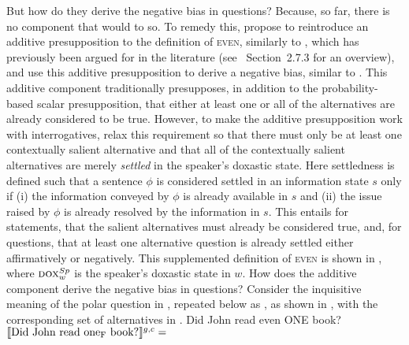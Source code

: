 But how do they derive the negative bias in questions? Because, so far, there is no component that would to so. To remedy this, \textcite{Jeong2021,Jeong2022} propose to reintroduce an additive presupposition to the definition of {\scshape even}, similarly to \textcite{Crnic2019}, which has previously been argued for in the literature (see \textcite[p.~110ff]{Guerzoni2003}~Section~2.7.3 for an overview), and use this additive presupposition to derive a negative bias, similar to \textcite{vanRooij2003}. This additive component traditionally presupposes, in addition to the probability-based scalar presupposition, that either at least one or all of the alternatives are already considered to be true. However, to make the additive presupposition work with interrogatives, \textcite{Jeong2021,Jeong2022} relax this requirement so that there must only be at least one contextually salient alternative and that all of the contextually salient alternatives are merely \textit{settled} in the speaker's doxastic state. Here settledness is defined such that a sentence $\phi$ is considered settled in an information state $s$ only if (i) the information conveyed by $\phi$ is already available in $s$ and (ii) the issue raised by $\phi$ is already resolved by the information in $s$. This entails for statements, that the salient alternatives must already be considered true, and, for questions, that at least one alternative question is already settled either affirmatively or negatively. This supplemented definition of {\scshape even} is shown in , where $\predicate{dox}^{Sp}_w$ is the speaker's doxastic state in $w$.
\ex
{}
\xe
How does the additive component derive the negative bias in questions? Consider the inquisitive meaning of the polar question in , repeated below as , as shown in , with the corresponding set of alternatives in .
\pex
\a Did John read even \MakeUppercase{one} book?
\a $\intension[g,c]{Did John read one\textsubscript{F} book?}=$
